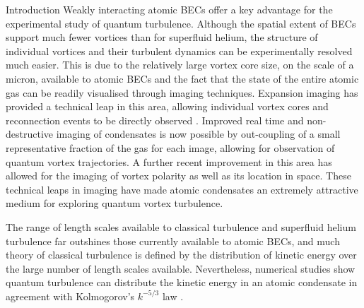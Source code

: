 \begin{chapter}{\label{cha:bose_gases}Introduction}
Weakly interacting atomic BECs offer a key advantage for the experimental study of quantum turbulence. Although the spatial extent of BECs support much fewer vortices than for superfluid helium, the structure of individual vortices and their turbulent dynamics can be experimentally resolved much easier. This is due to the relatively large vortex core size, on the scale of a micron, available to atomic BECs and the fact that the state of the entire atomic gas can be readily visualised through imaging techniques. Expansion imaging has provided a technical leap in this area, allowing individual vortex cores and reconnection events to be directly observed \cite{PhysRevLett.84.806,Raman01,kwon_moon_14}. Improved real time and non-destructive imaging of condensates is now possible \cite{Freilich2010} by out-coupling of a small representative fraction of the gas for each image, allowing for observation of quantum vortex trajectories. A further recent improvement in this area \cite{powis} has allowed for the imaging of vortex polarity as well as its location in space. These technical leaps in imaging have made atomic condensates an extremely attractive medium for exploring quantum vortex turbulence. 

The range of length scales available to classical turbulence and superfluid helium turbulence far outshines those currently available to atomic BECs, and much theory of classical turbulence is defined by the distribution of kinetic energy over the large number of length scales available. Nevertheless, numerical studies show quantum turbulence can distribute the kinetic energy in an atomic condensate in agreement with Kolmogorov's $k^{-5/3}$ law \cite{Nore,Kobayashi,PhysRevLett.103.084501}.


\end{chapter}
